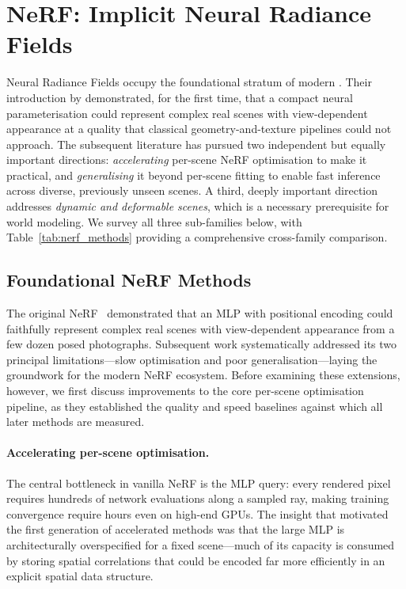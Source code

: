 \section{NeRF: Implicit Neural Radiance Fields}
\label{sec:nerf}

Neural Radiance Fields occupy the foundational stratum of modern \nvs{}.
Their introduction by \citet{mildenhall2020nerf} demonstrated, for the first
time, that a compact neural parameterisation could represent complex real scenes
with view-dependent appearance at a quality that classical geometry-and-texture
pipelines could not approach.
The subsequent literature has pursued two independent but equally important
directions: \emph{accelerating} per-scene NeRF optimisation to make it
practical, and \emph{generalising} it beyond per-scene fitting to enable fast
inference across diverse, previously unseen scenes.
A third, deeply important direction addresses \emph{dynamic and deformable scenes},
which is a necessary prerequisite for world modeling.
We survey all three sub-families below, with Table~\ref{tab:nerf_methods}
providing a comprehensive cross-family comparison.

\subsection{Foundational NeRF Methods}

The original NeRF~\citep{mildenhall2020nerf} demonstrated that an MLP with
positional encoding could faithfully represent complex real scenes with
view-dependent appearance from a few dozen posed photographs.
Subsequent work systematically addressed its two principal limitations---slow
optimisation and poor generalisation---laying the groundwork for the modern
NeRF ecosystem.
Before examining these extensions, however, we first discuss improvements to
the core per-scene optimisation pipeline, as they established the quality and
speed baselines against which all later methods are measured.

\paragraph{Accelerating per-scene optimisation.}
The central bottleneck in vanilla NeRF is the MLP query: every rendered pixel
requires hundreds of network evaluations along a sampled ray, making training
convergence require hours even on high-end GPUs.
The insight that motivated the first generation of accelerated methods was that
the large MLP is architecturally overspecified for a fixed scene---much of its
capacity is consumed by storing spatial correlations that could be encoded
far more efficiently in an explicit spatial data structure.


